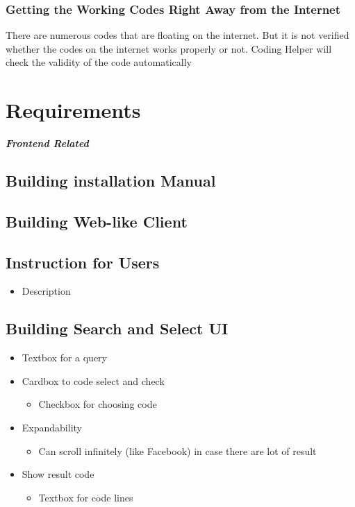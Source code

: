 \documentclass[conference]{IEEEtran}
\begin{document}
\subsubsection{Getting the Working Codes Right Away from the Internet}
There are numerous codes that are floating on the internet. But it is not verified whether the codes on the internet works properly or not. Coding Helper will check the validity of the code automatically 


\section{Requirements} %
\label{sec:requirements}


\textit{\textbf{Frontend Related}}

\subsection{Building installation Manual}
\textit{ }

\subsection{Building Web-like Client}
\textit{ }

\subsection{Instruction for Users}
\begin{itemize}
  \item Description
\end{itemize}
\textit{ }

\subsection{Building Search and Select UI}
\begin{itemize}
  \item Textbox for a query
  \item Cardbox to code select and check
  \begin{itemize}
    \item Checkbox for choosing code
  \end{itemize}
  \item Expandability
  \begin{itemize}
    \item Can scroll infinitely (like Facebook) in case there are lot of result
  \end{itemize}
  \item Show result code
  \begin{itemize}
    \item Textbox for code lines
  \end{itemize}
\end{itemize}
\textit{ }
\end{document}

